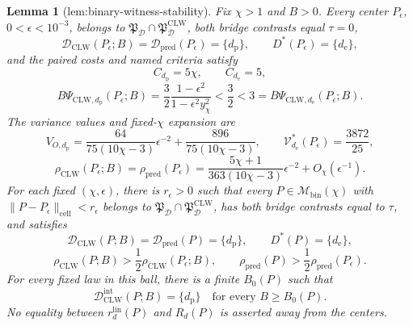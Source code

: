 \documentclass{article}
\newtheorem{lemma}{Lemma}
\begin{document}
\begin{lemma}[lem:binary-witness-stability]\label{lem:binary-witness-stability}
Fix \(\chi>1\) and \(B>0\). Every center \(P_\epsilon\), \(0<\epsilon<10^{-3}\), belongs to \(\mathfrak P_{\mathcal D}\cap\mathfrak P_{\mathcal D}^{\mathrm{CLW}}\), both bridge contrasts equal \(\tau=0\),
\[
 \mathcal D_{\mathrm{CLW}}(P_\epsilon;B)
 =\mathcal D_{\mathrm{pred}}(P_\epsilon)=\{d_{\mathrm p}\},
 \qquad D^*(P_\epsilon)=\{d_{\mathrm e}\},               \tag{1}
\]
and the paired costs and named criteria satisfy
\[
 C_{d_{\mathrm p}}=5\chi,
 \qquad C_{d_{\mathrm e}}=5,
\]
\[
 B\Psi_{\mathrm{CLW},d_{\mathrm p}}(P_\epsilon;B)
 =\frac32\frac{1-\epsilon^2}{1-\epsilon^2y_\chi^2}
 <\frac32<3
 =B\Psi_{\mathrm{CLW},d_{\mathrm e}}(P_\epsilon;B).      \tag{2}
\]
The variance values and fixed-\(\chi\) expansion are
\[
 V_{O,d_{\mathrm p}}
 =\frac{64}{75(10\chi-3)}\epsilon^{-2}
 +\frac{896}{75(10\chi-3)},
 \qquad
 \mathcal V_{d_{\mathrm e}}^*(P_\epsilon)=\frac{3872}{25},
\]
\[
 \rho_{\mathrm{CLW}}(P_\epsilon;B)
 =\rho_{\mathrm{pred}}(P_\epsilon)
 =\frac{5\chi+1}{363(10\chi-3)}\epsilon^{-2}
 +O_\chi(\epsilon^{-1}).                                  \tag{3}
\]
For each fixed \((\chi,\epsilon)\), there is \(r_\epsilon>0\) such that every \(P\in\mathcal M_{\mathrm{bin}}(\chi)\) with \(\|P-P_\epsilon\|_{\mathrm{cell}}<r_\epsilon\) belongs to \(\mathfrak P_{\mathcal D}\cap\mathfrak P_{\mathcal D}^{\mathrm{CLW}}\), has both bridge contrasts equal to \(\tau\), and satisfies
\[
 \mathcal D_{\mathrm{CLW}}(P;B)
 =\mathcal D_{\mathrm{pred}}(P)=\{d_{\mathrm p}\},
 \qquad D^*(P)=\{d_{\mathrm e}\},                         \tag{4}
\]
\[
 \rho_{\mathrm{CLW}}(P;B)>\frac12\rho_{\mathrm{CLW}}(P_\epsilon;B),
 \qquad
 \rho_{\mathrm{pred}}(P)>\frac12\rho_{\mathrm{pred}}(P_\epsilon). \tag{5}
\]
For every fixed law in this ball, there is a finite \(B_0(P)\) such that
\[
 \mathcal D_{\mathrm{CLW}}^{\mathrm{int}}(P;B)=\{d_{\mathrm p}\}
 \quad\text{for every }B\ge B_0(P).                       \tag{6}
\]
No equality between \(r_d^{\mathrm{lin}}(P)\) and \(R_d(P)\) is asserted away from the centers.
\end{lemma}
\end{document}

